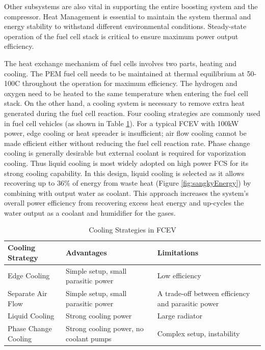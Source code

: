 \documentclass[a4paper,11pt]{article}
\begin{document}
Other subsystems are also vital in supporting the entire boosting system and the compressor. Heat Management is essential to maintain the system thermal and energy stability to withstand different environmental conditions. Steady-state operation of the fuel cell stack is critical to ensure maximum power output efficiency.  

The heat exchange mechanism of fuel cells involves two parts, heating and cooling. The PEM fuel cell needs to be maintained at thermal equilibrium at 50-100\degree C throughout the operation for maximum efficiency. The hydrogen and oxygen need to be heated to the same temperature when entering the fuel cell stack. On the other hand, a cooling system is necessary to remove extra heat generated during the fuel cell reaction. Four cooling strategies are commonly used in fuel cell vehicles (as shown in Table \ref{tab:coolingStrats}). For a typical FCEV with 100kW power, edge cooling or heat spreader is insufficient; air flow cooling cannot be made efficient either without reducing the fuel cell reaction rate\cite{wenthermalmanagement}. Phase change cooling is generally desirable but external coolant is required for vaporization cooling. Thus liquid cooling is most widely adopted on high power FCS for its strong cooling capability\cite{nguyen2020proton}.  In this design, liquid cooling is selected as it allows recovering up to 36\% of energy from waste heat (Figure \ref{fig:sangkyEnergy}) by combining with output water as coolant. This approach increases the system's overall power efficiency from recovering excess heat energy and up-cycles the water output as a coolant and humidifier for the gases. 

\begin{table}[h!]
    \centering
    \begin{tabular}{|p{}|p{}||p{}|} %
    \hline
    Cooling Strategy & Advantages & Limitations \\ [0.5ex] 
    \hline\hline
    Edge Cooling\cite{EdgeCooling} & Simple setup, small parasitic power & Low efficiency \\
    \hline
    Separate Air Flow\cite{AirCooling} & Simple setup, small parasitic power & A trade-off between efficiency and parasitic power \\
    \hline
    Liquid Cooling\cite{nguyen2020proton} & Strong cooling power & Large radiator \\
    \hline
    Phase Change Cooling\cite{PhaseCooling} & Strong cooling power, no coolant pumps & Complex setup, instability \\
    \hline
    \end{tabular}
    \caption{Cooling Strategies in FCEV\cite{bvumbe2016review}}
    \label{tab:coolingStrats}
\end{table}
\end{document}
